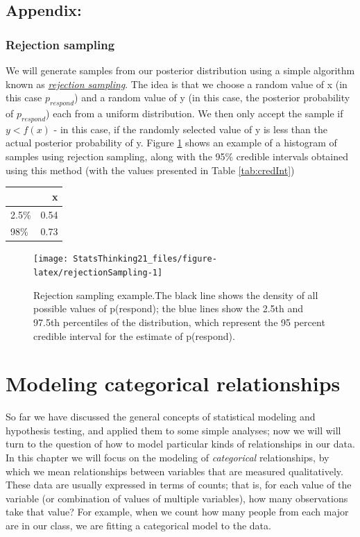 \documentclass[12pt,]{book}
\theoremstyle{definition}
\theoremstyle{definition}
\theoremstyle{definition}
\theoremstyle{remark}
\begin{document}
\hypertarget{appendix-3}{%
\section{Appendix:}\label{appendix-3}}

\hypertarget{rejection-sampling}{%
\subsection{Rejection sampling}\label{rejection-sampling}}

We will generate samples from our posterior distribution using a simple algorithm known as \href{https://am207.github.io/2017/wiki/rejectionsampling.html}{\emph{rejection sampling}}. The idea is that we choose a random value of x (in this case \(p_{respond}\)) and a random value of y (in this case, the posterior probability of \(p_{respond}\)) each from a uniform distribution. We then only accept the sample if \(y < f(x)\) - in this case, if the randomly selected value of y is less than the actual posterior probability of y. Figure \ref{fig:rejectionSampling} shows an example of a histogram of samples using rejection sampling, along with the 95\% credible intervals obtained using this method (with the values presented in Table \ref{tab:credInt})

\begin{tabular}{l|r}
\hline
  & x\\
\hline
2.5\% & 0.54\\
\hline
98\% & 0.73\\
\hline
\end{tabular}

\begin{figure}
\texttt{[image: StatsThinking21\_files/figure-latex/rejectionSampling-1]} \caption{Rejection sampling example.The black line shows the density of all possible values of p(respond); the blue lines show the 2.5th and 97.5th percentiles of the distribution, which represent the 95 percent credible interval for the estimate of p(respond).}\label{fig:rejectionSampling}
\end{figure}

\hypertarget{modeling-categorical-relationships}{%
\chapter{Modeling categorical relationships}\label{modeling-categorical-relationships}}

So far we have discussed the general concepts of statistical modeling and hypothesis testing, and applied them to some simple analyses; now we will will turn to the question of how to model particular kinds of relationships in our data. In this chapter we will focus on the modeling of \emph{categorical} relationships, by which we mean relationships between variables that are measured qualitatively. These data are usually expressed in terms of counts; that is, for each value of the variable (or combination of values of multiple variables), how many observations take that value? For example, when we count how many people from each major are in our class, we are fitting a categorical model to the data.
\end{document}
